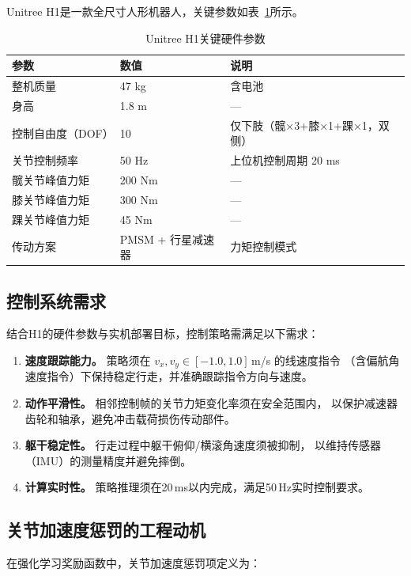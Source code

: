 \documentclass[12pt, a4paper]{article}
\begin{document}
Unitree H1是一款全尺寸人形机器人，关键参数如表~\ref{tab:h1_spec}所示。

\begin{table}[H]
\centering
\caption{Unitree H1关键硬件参数}
\label{tab:h1_spec}
\begin{tabular}{lll}
\toprule
参数 & 数值 & 说明 \\
\midrule
整机质量 & 47 kg & 含电池 \\
身高 & 1.8 m & — \\
控制自由度（DOF） & 10 & 仅下肢（髋×3+膝×1+踝×1，双侧） \\
关节控制频率 & 50 Hz & 上位机控制周期 20 ms \\
髋关节峰值力矩 & 200 Nm & — \\
膝关节峰值力矩 & 300 Nm & — \\
踝关节峰值力矩 & 45 Nm & — \\
传动方案 & PMSM + 行星减速器 & 力矩控制模式 \\
\bottomrule
\end{tabular}
\end{table}

\subsection{控制系统需求}

结合H1的硬件参数与实机部署目标，控制策略需满足以下需求：

\begin{enumerate}[label=(\arabic*)]
    \item \textbf{速度跟踪能力。} 策略须在 $v_x, v_y \in [-1.0, 1.0]$\,m/s 的线速度指令
          （含偏航角速度指令）下保持稳定行走，并准确跟踪指令方向与速度。
    \item \textbf{动作平滑性。} 相邻控制帧的关节力矩变化率须在安全范围内，
          以保护减速器齿轮和轴承，避免冲击载荷损伤传动部件。
    \item \textbf{躯干稳定性。} 行走过程中躯干俯仰/横滚角速度须被抑制，
          以维持传感器（IMU）的测量精度并避免摔倒。
    \item \textbf{计算实时性。} 策略推理须在20\,ms以内完成，满足50\,Hz实时控制要求。
\end{enumerate}

\subsection{关节加速度惩罚的工程动机}

在强化学习奖励函数中，关节加速度惩罚项定义为：
\end{document}
